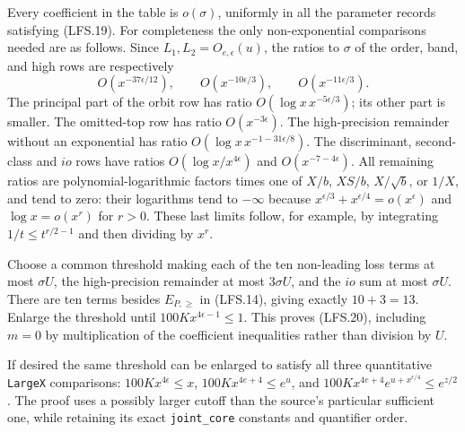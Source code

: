 Every coefficient in the table is $o(\sigma)$, uniformly in
all the parameter records satisfying (LFS.19).
For completeness the only non-exponential comparisons needed
are as follows.  Since $L_1,L_2=O_{e,\epsilon}(u)$, the ratios
to $\sigma$ of the order, band, and high rows are respectively
\[
 O(x^{-37\epsilon/12}),\qquad
 O(x^{-10\epsilon/3}),\qquad O(x^{-11\epsilon/3}).
\]
The principal part of the orbit row has ratio
$O(\log x\,x^{-5\epsilon/3})$; its other part is smaller.
The omitted-top row has ratio $O(x^{-3\epsilon})$.
The high-precision remainder without an exponential has ratio
$O(\log x\,x^{-1-31\epsilon/8})$.
The discriminant, second-class and $io$ rows have ratios
$O(\log x/x^{4\epsilon})$ and $O(x^{-7-4\epsilon})$.
All remaining ratios are polynomial-logarithmic factors times
one of $X/b$, $XS/b$, $X/\sqrt b$, or $1/X$, and tend to zero:
their logarithms tend to $-\infty$ because
$x^{\epsilon/3}+x^{\epsilon/4}=o(x^\epsilon)$ and
$\log x=o(x^r)$ for $r>0$.
These last limits follow, for example, by integrating
$1/t\le t^{r/2-1}$ and then dividing by $x^r$.

Choose a common threshold making each of the ten non-leading
loss terms at most $\sigma U$, the high-precision remainder at
most $3\sigma U$, and the $io$ sum at most $\sigma U$.
There are ten terms besides $E_{P,\ge}$ in (LFS.14), giving
exactly $10+3=13$.  Enlarge the threshold until
$100Kx^{4\epsilon-1}\le1$.  This proves (LFS.20), including
$m=0$ by multiplication of the coefficient inequalities rather
than division by $U$.

If desired the same threshold can be enlarged to satisfy all
three quantitative \texttt{LargeX} comparisons:
$100Kx^{4\epsilon}\le x$,
$100Kx^{4e+4}\le e^u$, and
$100Kx^{4e+4}e^{u+x^{\epsilon/4}}\le e^{z/2}$.
The proof uses a possibly larger cutoff than the source's
particular sufficient one, while retaining its exact
\texttt{joint\_core} constants and quantifier order.

